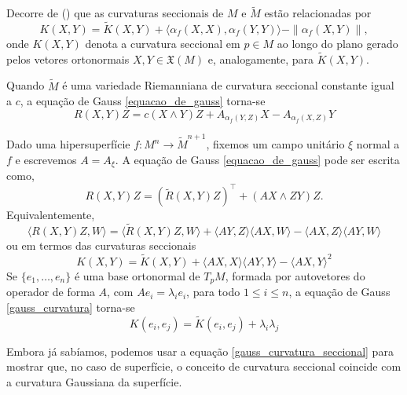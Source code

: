 Decorre de () que as curvaturas seccionais de $M$ e $\tilde{M}$ estão relacionadas por
\begin{equation*}
	K(X,Y) = \tilde{K}(X,Y) + \langle \alpha_f(X,X), \alpha_f(Y,Y) \rangle - \| \alpha_f(X,Y) \|,
\end{equation*}
onde $K(X,Y)$ denota a curvatura seccional em $p \in M$ ao longo do plano gerado pelos vetores ortonormais $X,Y \in \mathfrak{X}(M)$ e, analogamente, para $\tilde{K}(X,Y)$.

\begin{observacao}
	Quando $\tilde{M}$ é uma variedade Riemanniana de curvatura seccional constante igual a $c$, a equação de Gauss \eqref{equacao_de_gauss} torna-se
	\begin{equation*}
		R(X,Y)Z = c(X \wedge Y)Z + A_{\alpha_f(Y,Z)} X - A_{\alpha_f(X,Z)} Y
	\end{equation*}
\end{observacao}

\begin{observacao}
	Dado uma hipersuperfície $f: M^n \rightarrow \tilde{M}^{n+1}$, fixemos um campo unitário $\xi$ normal a $f$ e escrevemos $A = A_\xi$. A equação de Gauss \eqref{equacao_de_gauss} pode ser escrita como,
	\begin{equation}\label{hipersuperficie_equacao_gauss}
		R(X,Y)Z = (\tilde{R}(X,Y)Z)^\top + (AX \wedge ZY)Z.
	\end{equation}
	Equivalentemente,
	\begin{equation*}
		\langle R(X,Y)Z,W \rangle = \langle \tilde{R}(X,Y)Z,W \rangle + \langle AY,Z \rangle \langle AX,W \rangle - \langle AX,Z \rangle \langle AY,W \rangle
	\end{equation*}
	ou em termos das curvaturas seccionais
	\begin{equation}\label{gauss_curvatura}
		K(X,Y) = \tilde{K}(X,Y) + \langle AX,X \rangle \langle AY,Y \rangle - \langle AX,Y \rangle^2
	\end{equation}
	Se $\{ e_1, \ldots, e_n \}$ é uma base ortonormal de $T_p M$, formada por autovetores do operador de forma $A$, com $Ae_i = \lambda_i e_i$, para todo $1 \leq i \leq n$, a equação de Gauss \eqref{gauss_curvatura} torna-se
	\begin{equation}\label{gauss_curvatura_seccional}
		K(e_i,e_j) = \tilde{K}(e_i,e_j) + \lambda_i \lambda_j
	\end{equation}
\end{observacao}

Embora já sabíamos, podemos usar a equação \eqref{gauss_curvatura_seccional} para mostrar que, no caso de superfície, o conceito de curvatura seccional coincide com a curvatura Gaussiana da superfície.

